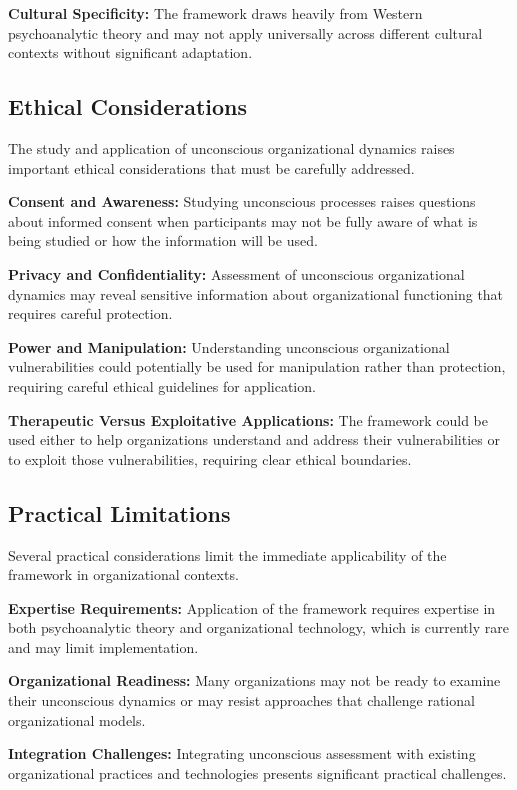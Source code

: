 \documentclass[10pt, twocolumn]{article}
\begin{document}
\textbf{Cultural Specificity:} The framework draws heavily from Western psychoanalytic theory and may not apply universally across different cultural contexts without significant adaptation.

\subsection{Ethical Considerations}

The study and application of unconscious organizational dynamics raises important ethical considerations that must be carefully addressed.

\textbf{Consent and Awareness:} Studying unconscious processes raises questions about informed consent when participants may not be fully aware of what is being studied or how the information will be used.

\textbf{Privacy and Confidentiality:} Assessment of unconscious organizational dynamics may reveal sensitive information about organizational functioning that requires careful protection.

\textbf{Power and Manipulation:} Understanding unconscious organizational vulnerabilities could potentially be used for manipulation rather than protection, requiring careful ethical guidelines for application.

\textbf{Therapeutic Versus Exploitative Applications:} The framework could be used either to help organizations understand and address their vulnerabilities or to exploit those vulnerabilities, requiring clear ethical boundaries.

\subsection{Practical Limitations}

Several practical considerations limit the immediate applicability of the framework in organizational contexts.

\textbf{Expertise Requirements:} Application of the framework requires expertise in both psychoanalytic theory and organizational technology, which is currently rare and may limit implementation.

\textbf{Organizational Readiness:} Many organizations may not be ready to examine their unconscious dynamics or may resist approaches that challenge rational organizational models.

\textbf{Integration Challenges:} Integrating unconscious assessment with existing organizational practices and technologies presents significant practical challenges.
\end{document}
